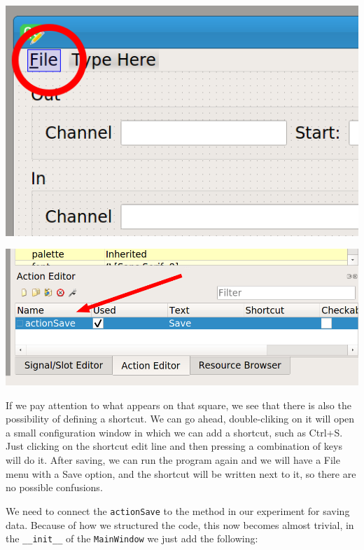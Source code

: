 \begin{minipage}{0.45\linewidth}
    \centering
    \includegraphics[width=\textwidth]{images/Chapter_09/13_menu_file.png}
\end{minipage}
\hspace{0.5cm}
\begin{minipage}{0.45\linewidth}
    \centering
    \includegraphics[width=\textwidth]{images/Chapter_09/13_action_save.png}
\end{minipage}

If we pay attention to what appears on that square, we see that there is also the possibility of defining a shortcut. We can go ahead, double-cliking on it will open a small configuration window in which we can add a shortcut, such as Ctrl+S. Just clicking on the shortcut edit line and then pressing a combination of keys will do it. After saving, we can run the program again and we will have a File menu with a Save option, and the shortcut will be written next to it, so there are no possible confusions.

We need to connect the \texttt{actionSave} to the method in our experiment for saving data. Because of how we structured the code, this now becomes almost trivial, in the \texttt{\_\_init\_\_} of the \texttt{MainWindow} we just add the following:

